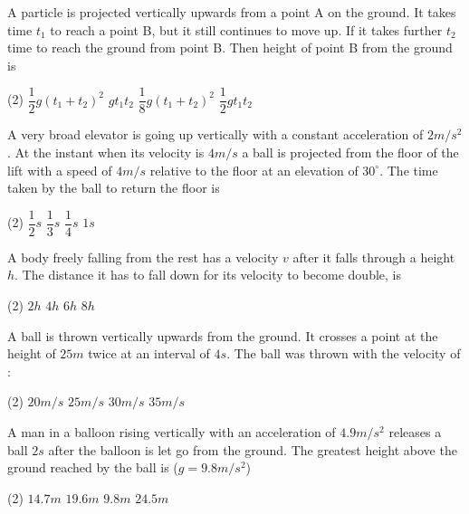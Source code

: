 
\item A particle is projected vertically upwards from a point A on the ground. It takes time $t_1$ to reach a point B, but it still continues to move up. If it takes further $t_2$ time to reach the ground from point B. Then height of point B from the ground is
\begin{tasks}(2)
\task $\dfrac{1}{2}g(t_1 + t_2)^2$
\task $gt_1t_2$
\task $\dfrac{1}{8}g(t_1 + t_2)^2$
\task $\dfrac{1}{2}gt_1  t_2$\ans
\end{tasks}

\item A very broad elevator is going up vertically with a constant acceleration of $2 m/s^2$. At the instant when its velocity is $4 m/s$ a ball is projected from the floor of the lift with a speed of $4m/s$ relative to the floor at an elevation of $30^\circ$. The time taken by the ball to return the floor is
\begin{tasks}(2)
\task $\dfrac{1}{2}s$
\task $\dfrac{1}{3}s$\ans
\task $\dfrac{1}{4}s$
\task $1s$
\end{tasks}


\item A body freely falling from the rest has a velocity $v$ after it falls through a height $h$. The distance it has to fall down for its velocity to become double, is
\begin{tasks}(2)
\task $2h$
\task $4h$\ans
\task $6h$
\task $8h$
\end{tasks}


\item A ball is thrown vertically upwards from the ground. It crosses a point at the height of $25 m$ twice at an interval of $4 s$. The ball was thrown with the velocity of :
\begin{tasks}(2)
\task $20 m/s$
\task $25 m/s$
\task $30 m/s$\ans
\task $35 m/s$
\end{tasks}

\item A man in a balloon rising vertically with an acceleration of $4.9 m/s^2$ releases a ball $2s$ after the balloon is let go from the ground. The greatest height above the ground reached by the ball is ($g = 9.8 m/s^2$)
\begin{tasks}(2)
\task $14.7 m$\ans
\task $19.6 m$
\task $9.8 m$
\task $24.5 m$
\end{tasks}

